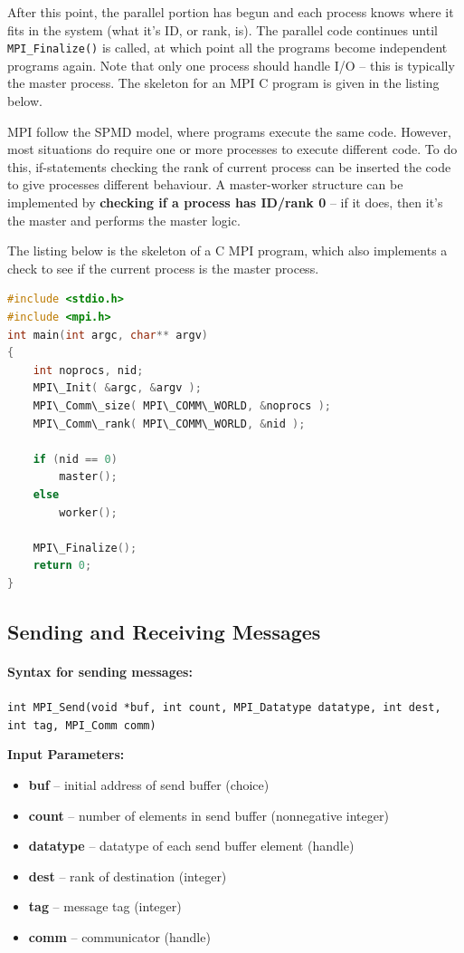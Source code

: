 \documentclass{article}
\begin{document}
After this point, the parallel portion has begun and each process knows where it fits in the system (what it's ID, or rank, is). The parallel code continues until \texttt{MPI\_Finalize()} is called, at which point all the programs become independent programs again. Note that only one process should handle I/O -- this is typically the master process. The skeleton for an MPI C program is given in the listing below.

MPI follow the SPMD model, where programs execute the same code. However, most situations do require one or more processes to execute different code. To do this, if-statements checking the rank of current process can be inserted the code to give processes different behaviour. A master-worker structure can be implemented by \textbf{checking if a process has ID/rank 0} -- if it does, then it's the master and performs the master logic.

The listing below is the skeleton of a C MPI program, which also implements a check to see if the current process is the master process.
\begin{lstlisting}[language=C,frame=single]
#include <stdio.h>
#include <mpi.h>
int main(int argc, char** argv)
{
	int noprocs, nid;
	MPI\_Init( &argc, &argv );
	MPI\_Comm\_size( MPI\_COMM\_WORLD, &noprocs );
	MPI\_Comm\_rank( MPI\_COMM\_WORLD, &nid );
	
	if (nid == 0)
		master();
	else
		worker();	
	
	MPI\_Finalize();
	return 0;
}
\end{lstlisting}

\subsection{Sending and Receiving Messages}

\paragraph{Syntax for sending messages:}
\texttt{int MPI\_Send(void *buf, int count, MPI\_Datatype datatype, int dest, int tag, MPI\_Comm comm)}

\textbf{Input Parameters:}
\begin{itemize}
	\item \textbf{buf} -- initial address of send buffer (choice)
	\item \textbf{count} -- number of elements in send buffer (nonnegative integer)
	\item \textbf{datatype} -- datatype of each send buffer element (handle)
	\item \textbf{dest} -- rank of destination (integer)
	\item \textbf{tag} -- message tag (integer)
	\item \textbf{comm} -- communicator (handle)
\end{itemize}
\end{document}
